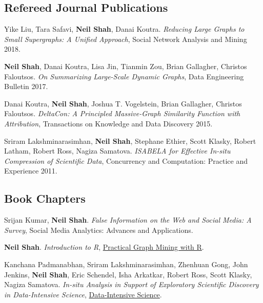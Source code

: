 \documentclass{article}
\begin{document}
\subsection*{\bf {Refereed Journal Publications}}
\begin{etaremune}[itemsep=0pt,parsep=0pt]

\item Yike Liu, Tara Safavi, {\bf Neil Shah}, Danai Koutra. \emph{Reducing Large Graphs to Small Supergraphs: A Unified Approach}, Social Network Analysis and Mining 2018.

\item {\bf Neil Shah}, Danai Koutra, Lisa Jin, Tianmin Zou, Brian Gallagher, Christos Faloutsos. \emph{On Summarizing Large-Scale Dynamic Graphs}, Data Engineering Bulletin 2017.

\item Danai Koutra, {\bf Neil Shah}, Joshua T. Vogelstein, Brian Gallagher, Christos Faloutsos. \emph{DeltaCon: A Principled Massive-Graph Similarity Function with Attribution}, Transactions on Knowledge and Data Discovery 2015.

\item Sriram Lakshminarasimhan, {\bf Neil Shah}, Stephane Ethier, Scott Klasky, Robert Latham, Robert Ross, Nagiza Samatova. \emph{ISABELA for Effective In-situ Compression of Scientific Data}, Concurrency and Computation: Practice and Experience 2011.
	
\end{etaremune}

\subsection*{\bf {Book Chapters}}

\begin{etaremune}[itemsep=0pt,parsep=0pt]

\item Srijan Kumar, {\bf Neil Shah}.  \emph{False Information on the Web and Social Media: A Survey}, Social Media Analytics: Advances and Applications.


\item {\bf Neil Shah}. \emph{Introduction to R},
\href{http://www.crcpress.com/product/isbn/9781439860847}{Practical Graph Mining with R}.

\item Kanchana Padmanabhan, Sriram Lakshminarasimhan, Zhenhuan Gong, John Jenkins, {\bf Neil Shah}, Eric Schendel, Isha Arkatkar, Robert Ross, Scott Klasky, Nagiza Samatova. \emph{In-situ Analysis in Support of Exploratory Scientific Discovery in Data-Intensive Science},
\href{http://www.crcpress.com/product/isbn/9781439881392}{Data-Intensive Science}.

\end{etaremune}
\end{document}
